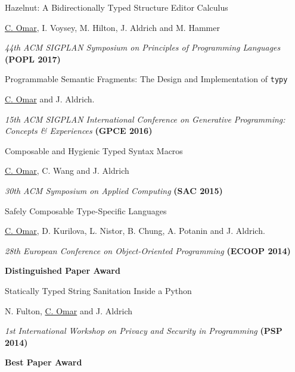 \documentclass[10pt,letterpaper]{article}
\renewenvironment{itemize}{
  \begin{list}{}{
    \setlength{\leftmargin}{1.25em}
    \setlength{\itemsep}{0.25em}
    \setlength{\parskip}{0pt}
    \setlength{\parsep}{0.2em}
  }
}{
  \end{list}
}
\begin{document}
\begin{enumerate}
  \item {Hazelnut: A Bidirectionally Typed Structure Editor Calculus}
        \begin{itemize}
          \item \underline{C. Omar}, I. Voysey, M. Hilton, J. Aldrich and M. Hammer
          \item \textit{44th ACM SIGPLAN Symposium on Principles of Programming Languages} {\textbf{(POPL 2017)}}
        \end{itemize}
  \item {Programmable Semantic Fragments: The Design and Implementation of \texttt{typy}}
        \begin{itemize}
          \item \underline{C. Omar} and J. Aldrich.
          \item \textit{15th ACM SIGPLAN International Conference on Generative Programming: Concepts \& Experiences} {\textbf{(GPCE 2016)}}
        \end{itemize}
  \item Composable and Hygienic Typed Syntax Macros
        \begin{itemize}
          \item \underline{C. Omar}, C. Wang and J. Aldrich
          \item \textit{30th ACM Symposium on Applied Computing} {\textbf{(SAC 2015)}}
        \end{itemize}
  \item {Safely Composable Type-Specific Languages}
        \begin{itemize}
          \item \underline{C. Omar}, D. Kurilova, L. Nistor, B. Chung, A. Potanin and J. Aldrich.
          \item \textit{28th European Conference on Object-Oriented Programming} {\textbf{(ECOOP 2014)}}
          \item \textbf{Distinguished Paper Award}
        \end{itemize}
  \item Statically Typed String Sanitation Inside a Python
        \begin{itemize}
          \item N. Fulton, \underline{C. Omar} and J. Aldrich
          \item \textit{1st International Workshop on Privacy and Security in Programming} {\textbf{(PSP 2014)}}
          \item \textbf{Best Paper Award}
        \end{itemize}

\end{enumerate}
\end{document}
